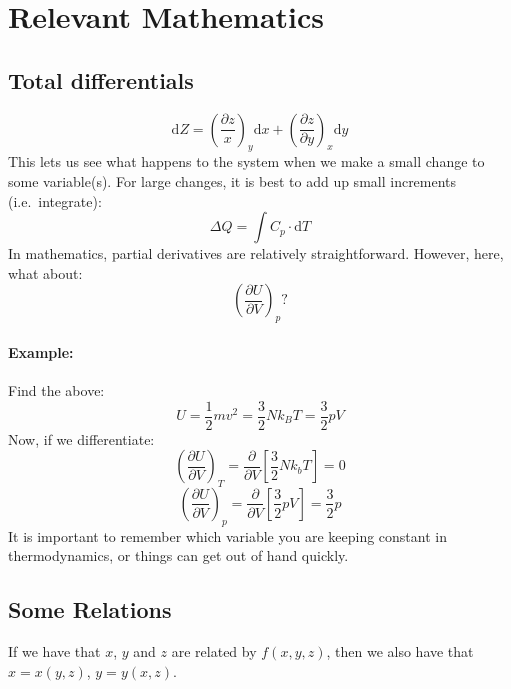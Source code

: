 \section{Relevant Mathematics}

\subsection{Total differentials}
$$
	\mathrm{d}Z = \left(\frac{\partial z}{x}\right)_y \mathrm{d}x +
	\left(\frac{\partial z}{\partial y}\right)_x \mathrm{d} y
$$
This lets us see what happens to the system when we make a small change to
some variable(s). For large changes, it is best to add up small increments
(i.e.\ integrate):
$$
	\Delta Q = \int C_p \cdot \mathrm{d}T
$$
In mathematics, partial derivatives are relatively straightforward. However,
here, what about:
$$
	\left(\frac{\partial U}{\partial V}\right)_p?
$$
\paragraph{Example:} Find the above:
$$
	U = \frac{1}{2}mv^2 = \frac{3}{2}Nk_BT = \frac{3}{2}pV
$$
Now, if we differentiate:
$$
	\left(\frac{\partial U}{\partial V}\right)_T =
	\frac{\partial}{\partial V}\left[\frac{3}{2}Nk_b T\right] = 0
$$
$$
	\left(\frac{\partial U}{\partial V}\right)_p = 
	\frac{\partial}{\partial V}\left[\frac{3}{2}pV\right] = \frac{3}{2}p
$$
It is important to remember which variable you are keeping constant in
thermodynamics, or things can get out of hand quickly.

\subsection{Some Relations}
If we have that $x$, $y$ and $z$ are related by $f(x,y,z)$, then we also have
that $x = x(y,z)$, $y = y(x,z)$.

